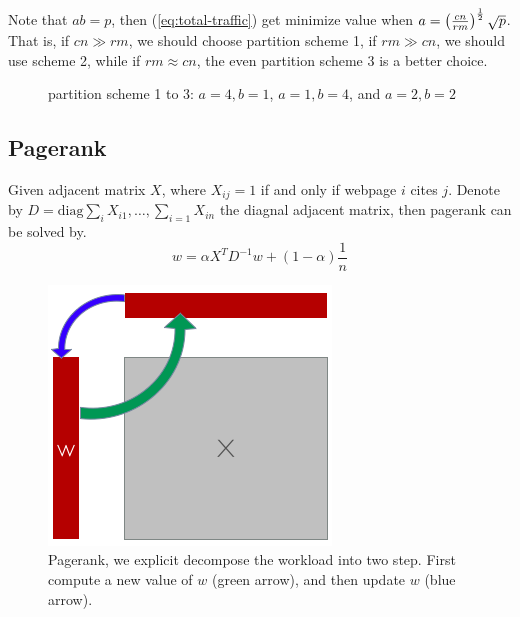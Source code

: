 \documentclass[11pt, twocolumn]{article}
\begin{document}
Note that $ab=p$, then (\ref{eq:total-traffic}) get minimize value when
$a = \left( \frac{cn}{rm} \right)^{\frac{1}{2}}\sqrt{p}$. That is, if $cn \gg rm$, we
should choose partition scheme 1, if $rm \gg cn$, we should use scheme 2, while
if $rm \approx cn$, the even partition scheme 3 is a better choice.

\begin{figure}[th!]
  \centering
{}
  \caption{partition scheme 1 to 3: $a=4,b=1$, $a=1,b=4$, and $a=2,b=2$}
\end{figure}

\subsection{Pagerank}
\label{sec:pagerank}

Given adjacent matrix $X$, where $X_{ij} = 1 $ if and only if webpage $i$ cites
$j$. Denote by $D=\textrm{diag}{\sum_i X_{i1}, \ldots, \sum_{i=1} X_{in}}$ the diagnal
adjacent matrix, then pagerank can be solved by.
\begin{equation}
  w = \alpha X^T D^{-1} w + (1-\alpha)\frac{1}{n}
\end{equation}

\begin{figure}[th!]
  \centering
  \includegraphics[width=.4\textwidth]{fig/pr}
  \caption{Pagerank, we explicit decompose the workload into two step. First
    compute a new value of $w$ (green arrow), and then update $w$ (blue arrow).}
  \label{fig:pr}
\end{figure}
\end{document}
